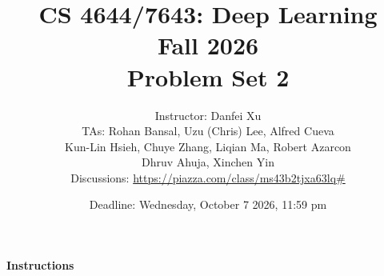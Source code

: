 \documentclass[11pt,english]{article}
\begin{document}
\title{CS 4644/7643: Deep Learning\\
Fall 2026 \\
Problem Set 2} 

\author{Instructor: Danfei Xu \\
TAs: Rohan Bansal, Uzu (Chris) Lee, Alfred Cueva  \\
Kun-Lin Hsieh, Chuye Zhang, Liqian Ma, Robert Azarcon  \\
Dhruv Ahuja, Xinchen Yin \\
Discussions: \url{https://piazza.com/class/ms43b2tjxa63lq\#}}
\date{Deadline: Wednesday, October 7 2026, 11:59 pm}
\maketitle


\paragraph*{Instructions}
\end{document}
